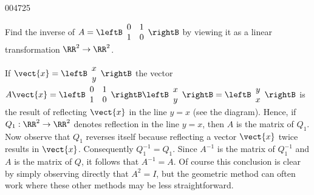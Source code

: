 \begin{example}{}{004725}
\begin{wrapfigure}[7]{l}{5cm}
\centering

\end{wrapfigure}

\setlength{\rightskip}{0pt plus 200pt}
Find the inverse of $A = \leftB \begin{array}{rr}
0 & 1 \\
1 & 0
\end{array} \rightB$
 by viewing it as a linear transformation $\RR^{2} \to \RR^{2}$.

\begin{solution}
  If $\vect{x} = \leftB \begin{array}{c}
  x \\
  y
  \end{array} \rightB$
 the vector $A\vect{x} = \leftB \begin{array}{rr}
 0 & 1 \\
 1 & 0
 \end{array} \rightB \leftB \begin{array}{c}
 x \\
 y
 \end{array} \rightB = \leftB \begin{array}{c}
 y \\
 x
 \end{array} \rightB$
 is the result of reflecting $\vect{x}$ in the line $y = x$ (see the diagram). Hence, if $Q_{1} : \RR^{2} \to \RR^{2}$ denotes reflection in the line $y = x$, then $A$ is the matrix of $Q_{1}$. Now observe that $Q_{1}$ reverses itself because reflecting a vector $\vect{x}$ twice results in $\vect{x}$. Consequently $Q_{1}^{-1} = Q_{1}$. Since $A^{-1}$ is the matrix of $Q_{1}^{-1}$ and $A$ is the matrix of $Q$, it follows that $A^{-1} = A$. Of course this conclusion is clear by simply observing directly that $A^{2} = I$, but the geometric method can often work where these other methods may be less straightforward.
\end{solution}
\end{example}
